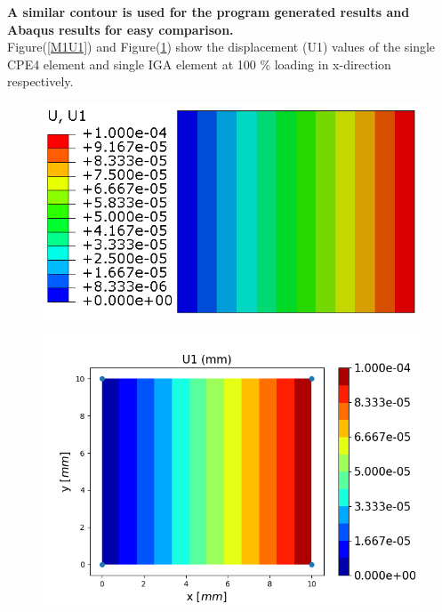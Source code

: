 \documentclass[11pt]{article}
\begin{document}
\textbf{A similar contour is used for the program generated results and Abaqus results for easy comparison. }\\
Figure(\ref{M1U1}) and Figure(\ref{M1U1_IGA}) show the displacement (U1) values of the single CPE4 element and single IGA element at 100 \% loading in x-direction respectively. \\
\begin{figure}[H]
	\centering
	\begin{minipage}{.5\textwidth}
		\centering
		\includegraphics[width=1\linewidth]{M1U1.png}
		\label{M1U1}
	\end{minipage}%
	\begin{minipage}{.55\textwidth}
		\centering
		\includegraphics[width=1\linewidth]{M1U1_IGA.png}
		\label{M1U1_IGA}
	\end{minipage}
\end{figure}
\end{document}
